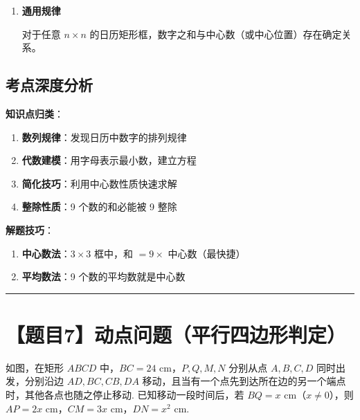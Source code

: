 \documentclass[UTF8]{ctexart}
\newenvironment{redenv}{\color{red}}{}
\newenvironment{conceptbox}{%
    \begin{tcolorbox}[colback=red!5, colframe=red!50!black, title=概念解析, fonttitle=\bfseries]
}{%
    \end{tcolorbox}
}
\newenvironment{formuladerivation}{%
    \begin{enumerate}[label={\textbf{公式\arabic*：}}, leftmargin=*, align=left]
}{%
    \end{enumerate}
}
\newcommand{\problemrule}{\noindent\rule{\textwidth}{1.5pt}\vspace{-0.8em}}
\begin{document}
\begin{redenv}
\begin{formuladerivation}
\textbf{推导}：9 个数构成等差数列的变形，中心数为 $x+8$，9 个数以中心数对称分布。

\item \textbf{通用规律}

对于任意 $n \times n$ 的日历矩形框，数字之和与中心数（或中心位置）存在确定关系。
\end{formuladerivation}

\subsection*{考点深度分析}

\begin{conceptbox}
\textbf{知识点归类}：
\begin{enumerate}
    \item \textbf{数列规律}：发现日历中数字的排列规律
    \item \textbf{代数建模}：用字母表示最小数，建立方程
    \item \textbf{简化技巧}：利用中心数性质快速求解
    \item \textbf{整除性质}：9 个数的和必能被 9 整除
\end{enumerate}
\end{conceptbox}

\noindent\textbf{解题技巧}：
\begin{enumerate}
    \item \textbf{中心数法}：$3 \times 3$ 框中，和 $= 9 \times$ 中心数（最快捷）
    \item \textbf{平均数法}：9 个数的平均数就是中心数
\end{enumerate}
\end{redenv}

\newpage

\problemrule
\section*{【题目7】动点问题（平行四边形判定）}
如图，在矩形 $ABCD$ 中，$BC = 24$ cm，$P, Q, M, N$ 分别从点 $A, B, C, D$ 同时出发，分别沿边 $AD, BC, CB, DA$ 移动，且当有一个点先到达所在边的另一个端点时，其他各点也随之停止移动. 已知移动一段时间后，若 $BQ = x$ cm（$x \neq 0$），则 $AP = 2x$ cm，$CM = 3x$ cm，$DN = x^2$ cm.
\end{document}
